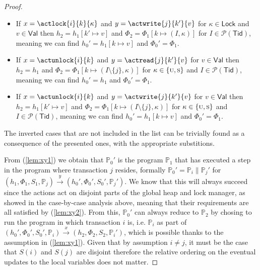 \begin{proof}
\begin{itemize}
	\item If $x = \actlock{i}{k}{\kappa}$ and $y = \actwrite{j}{k'}{v}$ for $\kappa \in \mathsf{Lock}$ and $v \in \mathsf{Val}$ then $h_2 = h_1[k' \mapsto v]$ and $\Phi_2 = \Phi_1[k \mapsto (I, \kappa)]$ for $I \in \mathcal{P}(\mathsf{Tid})$, meaning we can find $h_0' = h_1[k \mapsto v]$ and $\Phi_0' = \Phi_1$.
	
	\item If $x = \actunlock{i}{k}$ and $y = \actread{j}{k'}{v}$ for $v \in \mathsf{Val}$ then $h_2 = h_1$ and $\Phi_2 = \Phi_1[k \mapsto (I \setminus \{j\}, \kappa)]$ for $\kappa \in \{\textsc{u}, \textsc{s}\}$ and $I \in \mathcal{P}(\mathsf{Tid})$, meaning we can find $h_0' = h_1$ and $\Phi_0' = \Phi_1$.
	
	\item If $x = \actunlock{i}{k}$ and $y = \actwrite{j}{k'}{v}$ for $v \in \mathsf{Val}$ then $h_2 = h_1[k' \mapsto v]$ and $\Phi_2 = \Phi_1[k \mapsto (I \setminus \{j\}, \kappa)]$ for $\kappa \in \{\textsc{u}, \textsc{s}\}$ and $I \in \mathcal{P}(\mathsf{Tid})$, meaning we can find $h_0' = h_1[k \mapsto v]$ and $\Phi_0' = \Phi_1$.
\end{itemize}
The inverted cases that are not included in the list can be trivially found as a consequence of the presented ones, with the appropriate substitions.

From (\ref{lem:xy1}) we obtain that $\mathds{P}_0'$ is the program $\mathds{P}_1$ that has executed a step in the program where transaction $j$ resides, formally $\mathds{P}_0' = \mathds{P}_i \| \mathds{P}_j'$ for $(h_1, \Phi_1, S_1, \mathds{P}_j) \xrightarrow{y} (h_0', \Phi_0', S_0', \mathds{P}_j')$. We know that this will always succeed since the actions act on disjoint parts of the global heap and lock manager, as showed in the case-by-case analysis above, meaning that their requirements are all satisfied by (\ref{lem:xy2}). From this, $\mathds{P}_0'$ can always reduce to $\mathds{P}_2$ by chosing to run the program in which transaction $i$ is, i.e. $\mathds{P}_i$ as part of $(h_0', \Phi_0', S_0', \mathds{P}_i) \xrightarrow{x} (h_2, \Phi_2, S_2, \mathds{P}_i')$, which is possible thanks to the assumption in (\ref{lem:xy1}). Given that by assumption $i \neq j$, it must be the case that $S(i)$ and $S(j)$ are disjoint therefore the relative ordering on the eventual updates to the local variables does not matter.
\end{proof}

